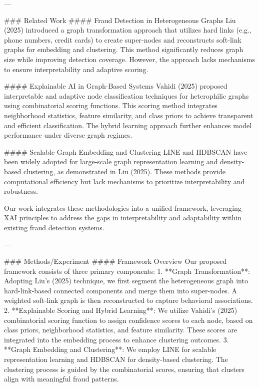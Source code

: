---

### Related Work  
#### Fraud Detection in Heterogeneous Graphs  
Liu (2025) introduced a graph transformation approach that utilizes hard links (e.g., phone numbers, credit cards) to create super-nodes and reconstructs soft-link graphs for embedding and clustering. This method significantly reduces graph size while improving detection coverage. However, the approach lacks mechanisms to ensure interpretability and adaptive scoring.

#### Explainable AI in Graph-Based Systems  
Vahidi (2025) proposed interpretable and adaptive node classification techniques for heterophilic graphs using combinatorial scoring functions. This scoring method integrates neighborhood statistics, feature similarity, and class priors to achieve transparent and efficient classification. The hybrid learning approach further enhances model performance under diverse graph regimes.

#### Scalable Graph Embedding and Clustering  
LINE and HDBSCAN have been widely adopted for large-scale graph representation learning and density-based clustering, as demonstrated in Liu (2025). These methods provide computational efficiency but lack mechanisms to prioritize interpretability and robustness.

Our work integrates these methodologies into a unified framework, leveraging XAI principles to address the gaps in interpretability and adaptability within existing fraud detection systems.

---

### Methods/Experiment  
#### Framework Overview  
Our proposed framework consists of three primary components:  
1. **Graph Transformation**: Adopting Liu's (2025) technique, we first segment the heterogeneous graph into hard-link-based connected components and merge them into super-nodes. A weighted soft-link graph is then reconstructed to capture behavioral associations.  
2. **Explainable Scoring and Hybrid Learning**: We utilize Vahidi's (2025) combinatorial scoring function to assign confidence scores to each node, based on class priors, neighborhood statistics, and feature similarity. These scores are integrated into the embedding process to enhance clustering outcomes.  
3. **Graph Embedding and Clustering**: We employ LINE for scalable representation learning and HDBSCAN for density-based clustering. The clustering process is guided by the combinatorial scores, ensuring that clusters align with meaningful fraud patterns.

